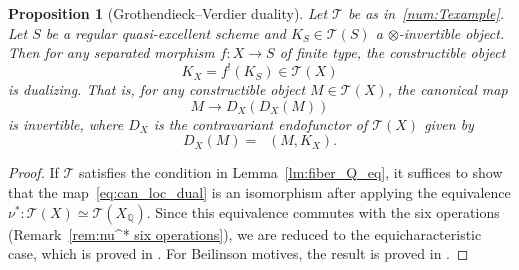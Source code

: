 \documentclass[11pt]{article}
\numberwithin{equation}{section}\renewcommand{\encodingdefault}{TU}
\newcommand{\T}{\mathscr T}
\DeclareMathOperator{\uHom}{\underline{Hom}}
\newcommand{\QQ} {\mathbb Q}
\newtheorem{prop}[thm]{Proposition}
\theoremstyle{remark}
\theoremstyle{definition}
\numberwithin{equation}{thm}
\begin{document}
\begin{prop}[Grothendieck--Verdier duality]\label{prop:duality}
Let $\T$ be as in~\ref{num:Texample}.
Let $S$ be a regular quasi-excellent scheme and $K_S \in \T(S)$ a $\otimes$-invertible object.
Then for any separated morphism $f:X\to S$ of finite type, the constructible object
\[K_{X}=f^!(K_S)\in\T(X)\]
is \emph{dualizing}.
That is, for any constructible object $M \in \T(X)$, the canonical map
\begin{equation}\label{eq:can_loc_dual}
M \to D_X(D_X(M))
\end{equation}
is invertible, where $D_X$ is the contravariant endofunctor of $\T(X)$ given by
\[ D_X(M) = \uHom(M, K_X). \]
\end{prop}

\begin{proof}
If $\T$ satisfies the condition in Lemma~\ref{lm:fiber_Q_eq}, it suffices to show that the map~\eqref{eq:can_loc_dual} is an isomorphism after applying the equivalence $\nu^* : \T(X) \simeq \T(X_\QQ)$.
Since this equivalence commutes with the six operations (Remark~\ref{rem:nu^* six operations}), we are reduced to the equicharacteristic case, which is proved in \cite[Th.\,2.4.9]{BD1}. For Beilinson motives, the result is proved in \cite[Th.\,2.3.2]{CisLect}.
\end{proof}
\end{document}
